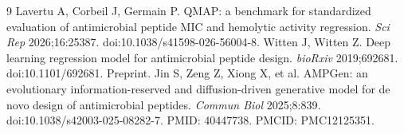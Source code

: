 \documentclass[11pt,a4paper]{article}
\begin{document}
\begingroup\raggedright\begin{thebibliography}{9}
 Lavertu A, Corbeil J, Germain P. QMAP: a benchmark for standardized evaluation of antimicrobial peptide MIC and hemolytic activity regression. \textit{Sci Rep} 2026;16:25387. doi:10.1038/s41598-026-56004-8.
 Witten J, Witten Z. Deep learning regression model for antimicrobial peptide design. \textit{bioRxiv} 2019;692681. doi:10.1101/692681. Preprint.
 Jin S, Zeng Z, Xiong X, et al. AMPGen: an evolutionary information-reserved and diffusion-driven generative model for de novo design of antimicrobial peptides. \textit{Commun Biol} 2025;8:839. doi:10.1038/s42003-025-08282-7. PMID: 40447738. PMCID: PMC12125351.
\end{thebibliography}\endgroup
\end{document}
